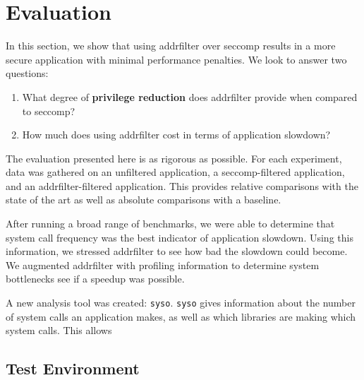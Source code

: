 \section{Evaluation}\label{sec:evaluation}

In this section, we show that using addrfilter over seccomp
results in a more secure application with minimal performance penalties. We
look to answer two questions:

\begin{enumerate}
    \item What degree of \textbf{privilege reduction} does addrfilter
        provide when compared to seccomp?
    \item How much does using addrfilter cost in terms of application
        slowdown?
\end{enumerate}

The evaluation presented here is as rigorous as possible. For each
experiment, data was gathered on an unfiltered application, a seccomp-filtered 
application, and an addrfilter-filtered application. This provides relative 
comparisons with the state of the art as well as absolute comparisons with a
baseline. %

After running a broad range of benchmarks, we were able to determine that 
system call frequency was the best indicator of application slowdown. Using 
this information, we stressed addrfilter to see how bad the slowdown could
become. We augmented addrfilter with profiling information to determine system
bottlenecks see if a speedup was possible.

A new analysis tool was created: \texttt{syso}. \texttt{syso} gives information
about the number of system calls an application makes, as well as which
libraries are making which system calls. This allows 

\subsection{Test Environment}
